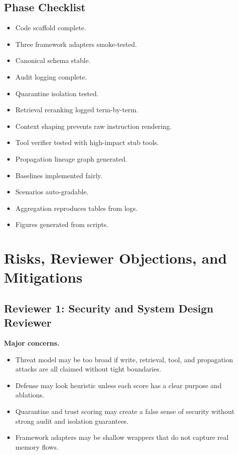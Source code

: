 \documentclass[11pt,oneside]{report}
\begin{document}
\section{Phase Checklist}

\begin{itemize}
  \item Code scaffold complete.
  \item Three framework adapters smoke-tested.
  \item Canonical schema stable.
  \item Audit logging complete.
  \item Quarantine isolation tested.
  \item Retrieval reranking logged term-by-term.
  \item Context shaping prevents raw instruction rendering.
  \item Tool verifier tested with high-impact stub tools.
  \item Propagation lineage graph generated.
  \item Baselines implemented fairly.
  \item Scenarios auto-gradable.
  \item Aggregation reproduces tables from logs.
  \item Figures generated from scripts.
\end{itemize}

\chapter{Risks, Reviewer Objections, and Mitigations}

\section{Reviewer 1: Security and System Design Reviewer}

\textbf{Major concerns.}
\begin{itemize}
  \item Threat model may be too broad if write, retrieval, tool, and propagation attacks are all
        claimed without tight boundaries.
  \item Defense may look heuristic unless each score has a clear purpose and ablations.
  \item Quarantine and trust scoring may create a false sense of security without strong audit and
        isolation guarantees.
  \item Framework adapters may be shallow wrappers that do not capture real memory flows.
\end{itemize}
\end{document}
